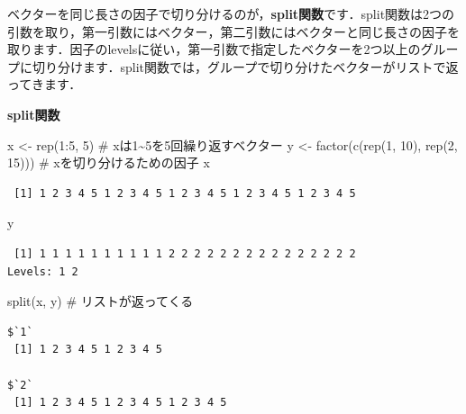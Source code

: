 \documentclass[
  letterpaper,
  DIV=11,
  numbers=noendperiod]{scrreprt}
\newenvironment{Shaded}{\begin{snugshade}}{\end{snugshade}}
\newcommand{\CommentTok}[1]{\textcolor[rgb]{0.37,0.37,0.37}{#1}}
\newcommand{\DecValTok}[1]{\textcolor[rgb]{0.68,0.00,0.00}{#1}}
\newcommand{\FunctionTok}[1]{\textcolor[rgb]{0.28,0.35,0.67}{#1}}
\newcommand{\NormalTok}[1]{\textcolor[rgb]{0.00,0.23,0.31}{#1}}
\newcommand{\OtherTok}[1]{\textcolor[rgb]{0.00,0.23,0.31}{#1}}
\newcommand{\SpecialCharTok}[1]{\textcolor[rgb]{0.37,0.37,0.37}{#1}}
\begin{document}
ベクターを同じ長さの因子で切り分けるのが，\textbf{split関数}です．split関数は2つの引数を取り，第一引数にはベクター，第二引数にはベクターと同じ長さの因子を取ります．因子のlevelsに従い，第一引数で指定したベクターを2つ以上のグループに切り分けます．split関数では，グループで切り分けたベクターがリストで返ってきます．

\textbf{split関数}

\begin{Shaded}
\begin{Highlighting}[]
\NormalTok{x }\OtherTok{\textless{}{-}} \FunctionTok{rep}\NormalTok{(}\DecValTok{1}\SpecialCharTok{:}\DecValTok{5}\NormalTok{, }\DecValTok{5}\NormalTok{) }\CommentTok{\# xは1\textasciitilde{}5を5回繰り返すベクター}
\NormalTok{y }\OtherTok{\textless{}{-}} \FunctionTok{factor}\NormalTok{(}\FunctionTok{c}\NormalTok{(}\FunctionTok{rep}\NormalTok{(}\DecValTok{1}\NormalTok{, }\DecValTok{10}\NormalTok{), }\FunctionTok{rep}\NormalTok{(}\DecValTok{2}\NormalTok{, }\DecValTok{15}\NormalTok{))) }\CommentTok{\# xを切り分けるための因子}
\NormalTok{x}
\end{Highlighting}
\end{Shaded}

\begin{verbatim}
 [1] 1 2 3 4 5 1 2 3 4 5 1 2 3 4 5 1 2 3 4 5 1 2 3 4 5
\end{verbatim}

\begin{Shaded}
\begin{Highlighting}[]
\NormalTok{y}
\end{Highlighting}
\end{Shaded}

\begin{verbatim}
 [1] 1 1 1 1 1 1 1 1 1 1 2 2 2 2 2 2 2 2 2 2 2 2 2 2 2
Levels: 1 2
\end{verbatim}

\begin{Shaded}
\begin{Highlighting}[]
\FunctionTok{split}\NormalTok{(x, y) }\CommentTok{\# リストが返ってくる}
\end{Highlighting}
\end{Shaded}

\begin{verbatim}
$`1`
 [1] 1 2 3 4 5 1 2 3 4 5

$`2`
 [1] 1 2 3 4 5 1 2 3 4 5 1 2 3 4 5
\end{verbatim}
\end{document}
